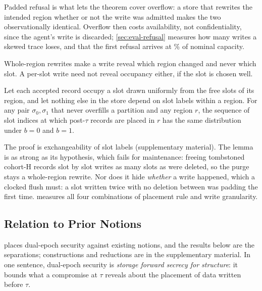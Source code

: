 Padded refusal is what lets the theorem cover overflow: a store that rewrites the intended region
whether or not the write was admitted makes the two observationally identical. Overflow then costs
availability, not confidentiality, since the agent's write is discarded; \cref{sec:eval-refusal}
measures how many writes a skewed trace loses, and that the first refusal arrives at
\REnineUtilP\% of nominal capacity.

Whole-region rewrites make a write reveal which region changed and never which slot. A per-slot
write need not reveal occupancy either, if the slot is chosen well.

\begin{lemma}
\label{lem:slot}
Let each accepted record occupy a slot drawn uniformly from the free slots of its region, and let
nothing else in the store depend on slot labels within a region. For any pair $\sigma_0, \sigma_1$
that never overfills a partition and any region $r$, the sequence of slot indices at which post-$\tau$
records are placed in $r$ has the same distribution under $b = 0$ and $b = 1$.
\end{lemma}

The proof is exchangeability of slot labels (supplementary material). The lemma is as strong as its
hypothesis, which fails for maintenance: freeing tombstoned cohort-H records slot by slot writes as
many slots as were deleted, so the purge stays a whole-region rewrite. Nor does it hide
\emph{whether} a write happened, which a clocked flush must: a slot written twice with no deletion
between was padding the first time.  measures all four combinations of placement
rule and write granularity.

\subsection{Relation to Prior Notions}
\label{sec:relations}

 places dual-epoch security against existing notions, and the results below are
the separations; constructions and reductions are in the supplementary material. In one sentence,
dual-epoch security is \emph{storage forward secrecy for structure}: it bounds what a compromise at
$\tau$ reveals about the placement of data written before $\tau$.

